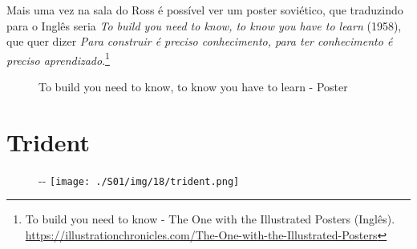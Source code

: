 \saveparinfos
\noindent
\begin{minipage}[c]{0.5\textwidth}\useparinfo

Mais uma vez na sala do Ross é possível ver um poster soviético, que
traduzindo para o Inglês seria \emph{To build you need to know, to know
you have to learn} (1958), que quer dizer \emph{Para construir é preciso
conhecimento, para ter conhecimento é preciso aprendizado}.\footnote{\sloppy To build you need to know - The One with the Illustrated Posters (Inglês). \url{https://illustrationchronicles.com/The-One-with-the-Illustrated-Posters}}

\end{minipage}\hfill
\begin{minipage}[c]{0.4\textwidth}

\begin{figure}
  \centering
    \caption{To build you need to know, to know you have to learn - Poster\label{fig:to-build-you-need-to-know-to-know-you-have-to-learn-poster}}
\end{figure}

\end{minipage}

\hypertarget{trident}{%
\section{Trident}\label{trident}}

\begin{figure}[!ht]
  \begin{adjustwidth}{-\oddsidemargin-1in}{-\rightmargin}
    \centering
    \texttt{[image: ./S01/img/18/trident.png]}
  \end{adjustwidth}
\end{figure}

